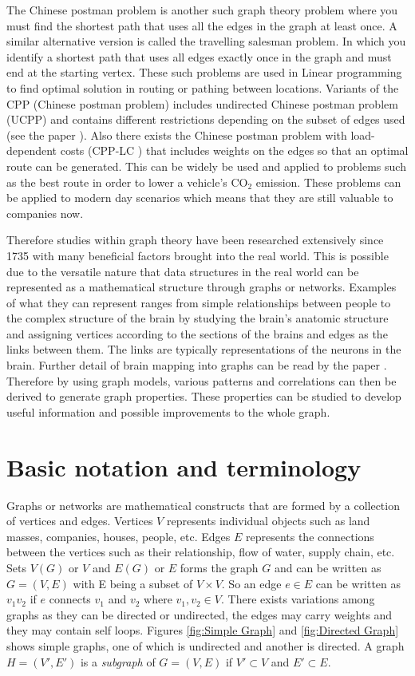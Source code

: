 The Chinese postman problem is another such graph theory problem where you must find the shortest path that uses all the edges in the graph at least once. A similar alternative version is called the travelling salesman problem. In which you identify a shortest path that uses all edges exactly once in the graph and must end at the starting vertex. These such problems are used in Linear programming to find optimal solution in routing or pathing between locations. Variants of the CPP (Chinese postman problem) includes undirected Chinese postman problem (UCPP) and contains different restrictions depending on the subset of edges used (see the paper \cite{IrnichStefan2008Uppw}). Also there exists the Chinese postman problem with load-dependent costs (CPP-LC \cite{CorberánÁngel2018TCPP}) that includes weights on the edges so that an optimal route can be generated. This can be widely be used and applied to problems such as the best route in order to lower a vehicle's CO$_2$ emission. These problems can be applied to modern day scenarios which means that they are still valuable to companies now.
\newline

Therefore studies within graph theory have been researched extensively since 1735 with many beneficial factors brought into the real world. This is possible due to the versatile nature that data structures in the real world can be represented as a mathematical structure through graphs or networks. Examples of what they can represent ranges from simple relationships between people to the complex structure of the brain by studying the brain's anatomic structure and assigning vertices according to the sections of the brains and edges as the links between them. The links are typically representations of the neurons in the brain. Further detail of brain mapping into graphs can be read by the paper \cite{articlebrain}. Therefore by using graph models, various patterns and correlations can then be derived to generate graph properties. These properties can be studied to develop useful information and possible improvements to the whole graph.

\section{Basic notation and terminology}
Graphs or networks are mathematical constructs that are formed by a collection of vertices and edges. Vertices $V$ represents individual objects such as land masses, companies, houses, people, etc. Edges $E$ represents the connections between the vertices such as their relationship, flow of water, supply chain, etc. Sets $V(G)$ or $V$ and $E(G)$ or $E$ forms the graph $G$ and can be written as $G=(V, E)$ with E being a subset of $V \times V$. So an edge $e \in E$ can be written as $v_{1}v_{2}$ if $e$ connects $v_{1}$ and $v_{2}$ where $v_{1}, v_{2} \in V$. There exists variations among graphs as they can be directed or undirected, the edges may carry weights and they may contain self loops. Figures \ref{fig:Simple Graph} and \ref{fig:Directed Graph} shows simple graphs, one of which is undirected and another is directed. A graph $H = (V', E')$ is a \emph{subgraph} of $G=(V, E)$ if $V' \subset V$ and $E' \subset E$.

